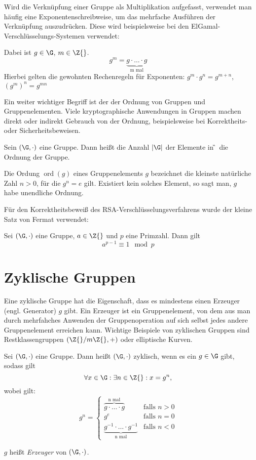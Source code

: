 Wird die Verknüpfung einer Gruppe als Multiplikation aufgefasst,
verwendet man häufig eine Exponentenschreibweise, um das mehrfache
Ausführen der Verknüpfung auszudrücken. Diese wird beispielsweise bei den
ElGamal-Verschlüsselungs-Systemen verwendet:

\begin{definition}
 Dabei ist $g\in \G$, $m \in \Z{}$.
\[ g^m = \underbrace{g \cdot \dotsc \cdot g}_{\text{m mal}} \]
Hierbei gelten die gewohnten Rechenregeln für Exponenten: $g^m\cdot g^n =
g^{m+n}$, $(g^m)^n = g^{mn}$
\end{definition}
Ein weiter wichtiger Begriff ist der der Ordnung von Gruppen und
Gruppenelementen. Viele kryptographische Anwendungen in Gruppen machen
direkt oder indirekt Gebrauch von der Ordnung, beispielsweise bei
Korrektheits- oder Sicherheitsbeweisen. 
\begin{definition}
  Sein $(\G, \cdot)$ eine Gruppe. Dann heißt die Anzahl $|\G|$ der Elemente in
  \G~die Ordnung der Gruppe.
\end{definition}

\begin{definition}
  Die Ordung $\operatorname{ord}(g) $ eines Gruppenelements $g$
  bezeichnet die kleinste 
  natürliche Zahl $n>0$, für die $g^n = e$ gilt. Existiert kein solches
  Element, so sagt man, $g$ habe unendliche Ordnung.
 \end{definition}

Für den Korrektheitsbeweiß des RSA-Verschlüsselungsverfahrens wurde der
kleine Satz von Fermat verwendet: 
 \begin{theorem}
   Sei $(\G, \cdot)$ eine Gruppe, $a \in \Z{}$ und $p$ eine
   Primzahl. Dann gilt
   \[a^{p-1} \equiv 1 \mod p\]
 \end{theorem}
\section{Zyklische Gruppen}
Eine zyklische Gruppe hat die Eigenschaft, dass es mindestens einen
Erzeuger (engl. Generator) $g$
gibt. Ein Erzeuger ist ein Gruppenelement, von dem aus man durch
mehrfahches Anwenden der Gruppenoperation auf sich selbst
jedes andere Gruppenelement erreichen kann. Wichtige Beispiele von
zyklischen Gruppen sind Restklassengruppen $(\Z{}/m\Z{}, +)$ oder
elliptische Kurven.

\begin{definition}
  Sei $(\G, \cdot)$ eine Gruppe. Dann heißt $(\G, \cdot)$ zyklisch, wenn
  es ein $g \in \G$ gibt, sodass gilt
  \[
    \forall x \in \G: \exists n \in \Z{}: x=g^n,
  \]
  wobei gilt:
\[
 g^n = 
  \begin{cases} 
   \overbrace{g \cdot \dotsc \cdot g}^{\text{n mal}} & \text{falls } n > 0 \\
   g^e       & \text{falls } n = 0 \\
   \underbrace{g^{-1} \cdot \dotsc \cdot g^{-1}}_{\text{n mal}} &
   \text{falls }n < 0
  \end{cases}
\]

$g$ heißt \textit{Erzeuger} von $(\G, \cdot)$. 
\end{definition}


